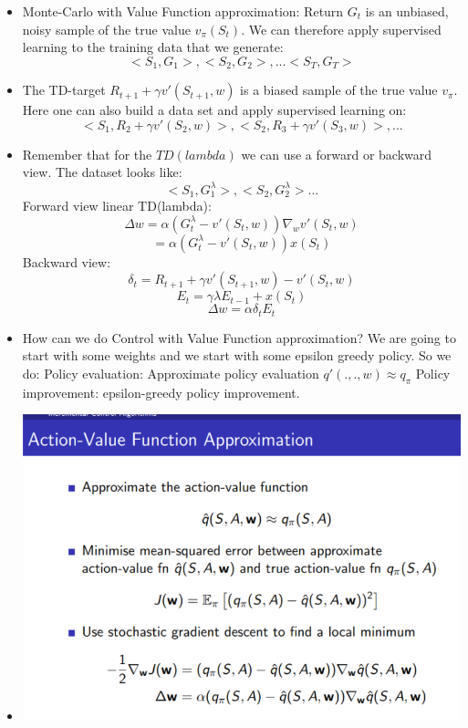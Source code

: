 \documentclass[a4paper]{article}
\begin{document}
\begin{itemize}
    \item Monte-Carlo with Value Function approximation: Return $G_t$ is an unbiased, noisy sample of the true value $v_{\pi}(S_t)$. We can therefore apply supervised learning to the training data that we generate: 
    $$<S_1,G_1>, <S_2,G_2>, ...<S_T,G_T>$$
    \item The TD-target $R_{t+1} + \gamma v'(S_{t+1},w)$ is a biased sample of the true value $v_{\pi}$. Here one can also build a data set and apply supervised learning on: 
    $$<S_1,R_2 + \gamma v'(S_2,w)>, <S_2, R_3 + \gamma v'(S_3,w)>, ...$$
    \item Remember that for the $TD(lambda)$ we can use a forward or backward view. The dataset looks like: 
    $$<S_1, G_1^{\lambda}>, <S_2, G_2^{\lambda}> ...$$
    Forward view linear TD(lambda): 
    $$\Delta w = \alpha(G_t^{\lambda} - v'(S_t, w))\nabla_w v'(S_t,w)$$
    $$= \alpha(G_t^{\lambda} - v'(S_t,w))x(S_t)$$
    Backward view: $$\delta_t = R_{t+1} + \gamma v'(S_{t+1},w) - v'(S_t,w)$$
    $$E_t = \gamma \lambda E_{t-1} + x(S_t) $$
    $$\Delta w = \alpha \delta_t E_t$$
    \item How can we do Control with Value Function approximation? We are going to start with some weights and we start with some epsilon greedy policy. So we do: \newline 
    Policy evaluation: Approximate policy evaluation $q'(.,.,w) \approx q_{\pi}$
    \newline Policy improvement: epsilon-greedy policy improvement. 
    \item 
    \begin{center}
    \includegraphics[width = \textwidth]{images/actionvalue approx.png}

\end{center}
\end{itemize}
\end{document}
